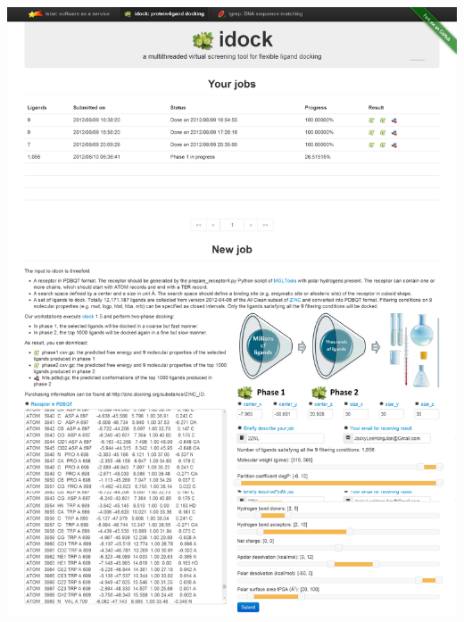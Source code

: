 \documentclass[12pt]{article}
\begin{document}
\clearpage

\begin{center}
\includegraphics[width=\linewidth,keepaspectratio=true]{idock.png}
\end{center}

\clearpage
\end{document}
